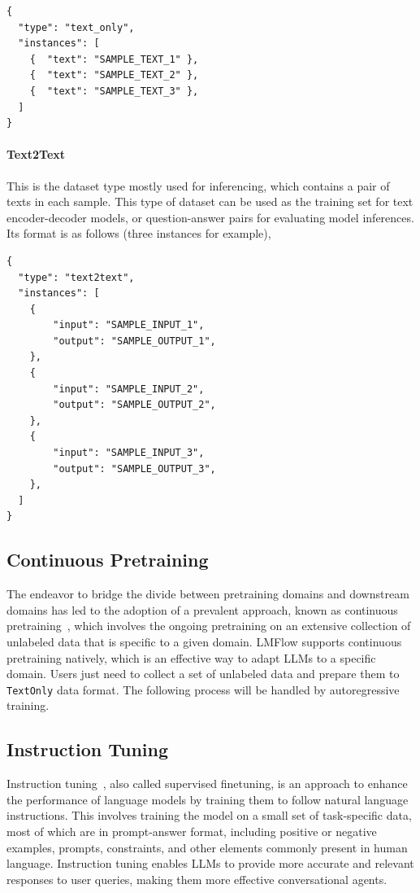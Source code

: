 \documentclass[11pt]{article}
\begin{document}
\begin{lstlisting}[style = python]
{
  "type": "text_only",
  "instances": [
    {  "text": "SAMPLE_TEXT_1" },
    {  "text": "SAMPLE_TEXT_2" },
    {  "text": "SAMPLE_TEXT_3" },
  ]
}
\end{lstlisting}


\paragraph{Text2Text}
This is the dataset type mostly used for inferencing, which contains a pair of texts in each sample. 
This type of dataset can be used as the training set for text encoder-decoder models, or question-answer pairs for evaluating model inferences. Its format is as follows (three instances for example),
\begin{lstlisting}[style = python]
{
  "type": "text2text",
  "instances": [
    {
        "input": "SAMPLE_INPUT_1",
        "output": "SAMPLE_OUTPUT_1",
    },
    {
        "input": "SAMPLE_INPUT_2",
        "output": "SAMPLE_OUTPUT_2",
    },
    {
        "input": "SAMPLE_INPUT_3",
        "output": "SAMPLE_OUTPUT_3",
    },
  ]
}
\end{lstlisting}

\subsection{Continuous Pretraining}
The endeavor to bridge the divide between pretraining domains and downstream domains has led to the adoption of a prevalent approach, known as continuous pretraining~\citep{beltagy2019scibert, alsentzer2019publicly, huang2019clinicalbert, lee2020biobert}, which involves the ongoing pretraining on an extensive collection of unlabeled data that is specific to a given domain.
LMFlow supports continuous pretraining natively, which is an effective way to adapt LLMs to a specific domain.
Users just need to collect a set of unlabeled data and prepare them to \texttt{TextOnly} data format. 
The following process will be handled by autoregressive training.

\subsection{Instruction Tuning}
Instruction tuning~\citep{sanhmultitask, weifinetuned, chung2022scaling, muennighoff2022crosslingual, wang2022self}, also called supervised finetuning, is an approach to enhance the performance of language models by training them to follow natural language instructions. 
This involves training the model on a small set of task-specific data, most of which are in prompt-answer format, including positive or negative examples, prompts, constraints, and other elements commonly present in human language. 
Instruction tuning enables LLMs to provide more accurate and relevant responses to user queries, making them more effective conversational agents.
\end{document}
